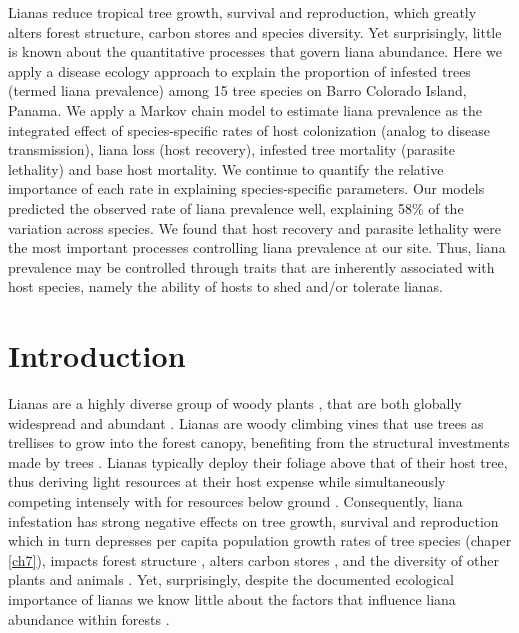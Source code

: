\documentclass[b5paper,justified]{tufte-book} %
\begin{document}
\begin{fullwidth}
Lianas reduce tropical tree growth, survival and reproduction, which greatly alters forest structure, carbon stores and species diversity. Yet surprisingly, little is known about the quantitative processes that govern liana abundance. Here we apply a disease ecology approach to explain the proportion of infested trees (termed liana prevalence) among 15 tree species on Barro Colorado Island, Panama. We apply a Markov chain model to estimate liana prevalence as the integrated effect of species-specific rates of host colonization (analog to disease transmission), liana loss (host recovery), infested tree mortality (parasite lethality) and base host mortality. We continue to quantify the relative importance of each rate in explaining species-specific parameters. Our models predicted the observed rate of liana prevalence well, explaining 58\% of the variation across species. We found that host recovery and parasite lethality were the most important processes controlling liana prevalence at our site. Thus, liana prevalence may be controlled through traits that are inherently associated with host species, namely the ability of hosts to shed and/or tolerate lianas.


\section{Introduction}

Lianas are a highly diverse group of woody plants \citep{Putz1984a}, that are both globally widespread and abundant \citep{Dewalt2015}.  Lianas are woody climbing vines that use trees as trellises to grow into the forest canopy, benefiting from the structural investments made by trees \citep{Schnitzer2002}. Lianas typically deploy their foliage above that of their host tree, thus deriving light resources at their host expense \citep{Putz1984a, Avalos1999} while simultaneously competing intensely with for resources below ground \citep{Schnitzer2005, Toledo-Aceves2014}. Consequently, liana infestation has strong negative effects on tree growth, survival and reproduction \citep{Schnitzer2002, Ingwell2010, Wright2015} which in turn depresses per capita population growth rates of tree species (chaper \ref{ch7}),  impacts forest structure \citep{Schnitzer2000, Schnitzer2014}, alters carbon stores \citep{Schnitzer2014, Heijden2015}, and the diversity of other plants and animals \citep[reviewed in][]{Schnitzer2002}. Yet, surprisingly, despite the documented ecological importance of lianas we know little about the factors that influence liana abundance within forests \citep{Muller-Landau2016}.


\end{fullwidth}
\end{document}
